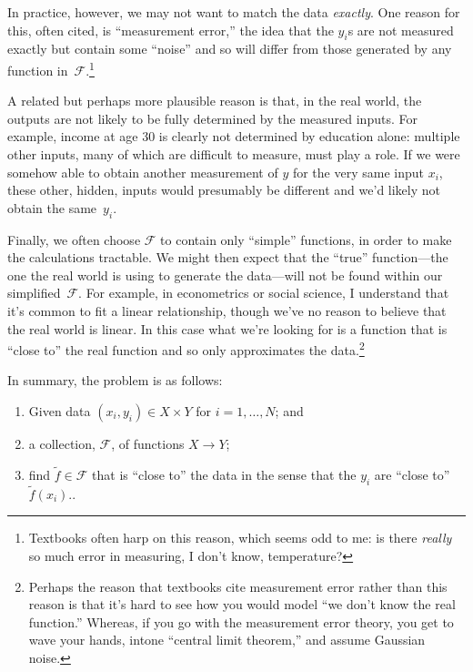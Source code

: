 \documentclass[11pt, a4paper]{article}
\begin{document}
In practice, however, we may not want to match the data
\emph{exactly}. One reason for this, often cited, is “measurement
error,” the idea that the $y_i$s are not measured exactly but contain
some “noise” and so will differ from those generated by any function
in~$\mathcal{F}$.\footnote{Textbooks often harp on this reason, which seems odd
to me: is there \emph{really} so much error in measuring, I don't
know, temperature?}

A related but perhaps more plausible reason is that, in the real
world, the outputs are not likely to be fully determined by the
measured inputs. For example, income at age 30 is clearly not
determined by education alone: multiple other inputs, many of which
are difficult to measure, must play a role. If we were somehow able to
obtain another measurement of $y$ for the very same input $x_i$, these
other, hidden, inputs would presumably be different and we'd likely
not obtain the same~$y_i$.

Finally, we often choose $\mathcal{F}$ to contain only “simple” functions, in
order to make the calculations tractable. We might then expect that
the “true” function---the one the real world is using to generate the
data---will not be found within our simplified~$\mathcal{F}$. For example, in
econometrics or social science, I understand that it's common to fit a
linear relationship, though we've no reason to believe that the real
world is linear. In this case what we're looking for is a function
that is “close to” the real function and so only approximates the
data.\footnote{Perhaps the reason that textbooks cite measurement
error rather than this reason is that it's hard to see how you would
model “we don't know the real function.” Whereas, if you go with the
measurement error theory, you get to wave your hands, intone “central
limit theorem,” and assume Gaussian noise.}

In summary, the problem is as follows:
\begin{enumerate}
\item Given data $(x_i, y_i) \in X\times Y$ for $i=1,\dots,N$; and
\item a collection, $\mathcal{F}$, of functions $X\to Y$;
\item find $\tilde{f}\in\mathcal{F}$ that is “close to” the data in the sense that
  the $y_i$ are “close to”~$\tilde{f}(x_i)$..
\end{enumerate}
\end{document}

